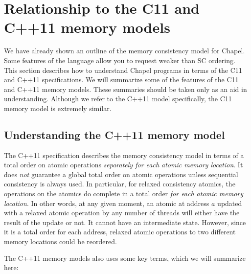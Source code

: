 \section{Relationship to the C11 and C++11 memory models}
\label{relating_to_C_MCM}

We have already shown an outline of the memory consistency model for Chapel.
Some features of the language allow you to request  weaker than SC
ordering. This section describes how to understand Chapel programs in terms of
the C11 and C++11 specifications. We will summarize some of the features of the
C11 and C++11 memory models. These summaries should be taken only as an aid in
understanding. Although we refer to the C++11 model specifically, the C11
memory model is extremely similar.

\subsection{Understanding the C++11 memory model}

The C++11 specification describes the memory consistency model in terms of
a total order on atomic operations \textit{separately for each atomic
memory location}. It does \textit{not} guarantee a global total order
on atomic operations unless sequential consistency is always used. In
particular, for relaxed consistency atomics, the operations on the atomics
do complete in a total order \textit{for each atomic memory location}.  In
other words, at any given moment, an atomic at address $a$ updated with a
relaxed atomic operation by any number of threads will either have the
result of the update or not. It cannot have an intermediate state.
However, since it is a total order for each address, relaxed atomic
operations to two different memory locations could be reordered.

The C++11 memory models also uses some key terms, which we will summarize here:

